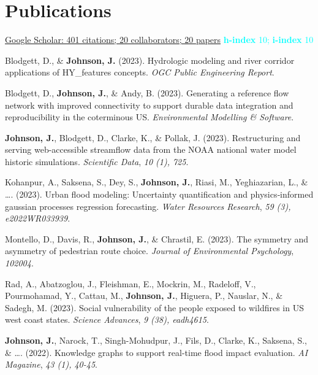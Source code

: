\documentclass[11pt,a4paper,]{awesome-cv}
\begin{document}
\hypertarget{publications}{%
\section{Publications}\label{publications}}

\textcolor{cyan}{ \href{https://tinyurl.com/mike-google-scholar}{ Google Scholar: 401 citations;  20 collaborators;  20 papers} \newline
\textbf{h-index} 10; \textbf{i-index} 10}

\hypertarget{bibliography}{}
\leavevmode{}%
Blodgett, D., \& \textbf{Johnson, J.} (2023). Hydrologic modeling and
river corridor applications of HY\_features concepts. \emph{OGC Public
Engineering Report}.

\leavevmode{}%
Blodgett, D., \textbf{Johnson, J.}, \& Andy, B. (2023). Generating a
reference flow network with improved connectivity to support durable
data integration and reproducibility in the coterminous US.
\emph{Environmental Modelling \& Software}.

\leavevmode{}%
\textbf{Johnson, J.}, Blodgett, D., Clarke, K., \& Pollak, J. (2023).
Restructuring and serving web-accessible streamflow data from the NOAA
national water model historic simulations. \emph{Scientific Data},
\emph{10 (1), 725}.

\leavevmode{}%
Kohanpur, A., Saksena, S., Dey, S., \textbf{Johnson, J.}, Riasi, M.,
Yeghiazarian, L., \& \ldots. (2023). Urban flood modeling: Uncertainty
quantification and physics‐informed gaussian processes regression
forecasting. \emph{Water Resources Research}, \emph{59 (3),
e2022WR033939}.

\leavevmode{}%
Montello, D., Davis, R., \textbf{Johnson, J.}, \& Chrastil, E. (2023).
The symmetry and asymmetry of pedestrian route choice. \emph{Journal of
Environmental Psychology}, \emph{102004}.

\leavevmode{}%
Rad, A., Abatzoglou, J., Fleishman, E., Mockrin, M., Radeloff, V.,
Pourmohamad, Y., Cattau, M., \textbf{Johnson, J.}, Higuera, P., Nauslar,
N., \& Sadegh, M. (2023). Social vulnerability of the people exposed to
wildfires in US west coast states. \emph{Science Advances}, \emph{9
(38), eadh4615}.

\leavevmode{}%
\textbf{Johnson, J.}, Narock, T., Singh-Mohudpur, J., Fils, D., Clarke,
K., Saksena, S., \& \ldots. (2022). Knowledge graphs to support
real-time flood impact evaluation. \emph{AI Magazine}, \emph{43 (1),
40-45}.
\end{document}
